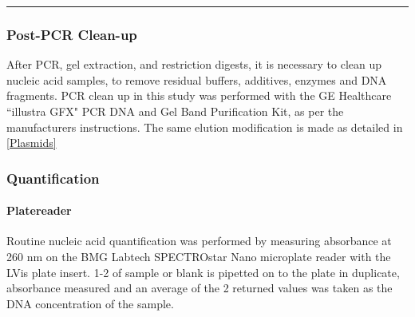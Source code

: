 \hrule
		
	\subsubsection{Post-PCR Clean-up}\label{pcrcleanup}
	After PCR, gel extraction, and restriction digests, it is necessary to clean up nucleic acid samples, to remove residual buffers, additives, enzymes and DNA fragments. PCR clean up in this study was performed with the GE Healthcare ``illustra GFX" PCR DNA and Gel Band Purification Kit, as per the manufacturers instructions. The same elution modification is made as detailed in \vref{Plasmids}
	
	\subsubsection{Quantification}
	\paragraph{Platereader}
	Routine nucleic acid quantification was performed by measuring absorbance at 260 nm on the BMG Labtech SPECTROstar Nano microplate reader with the LVis plate insert. 1-2\ul{} of sample or blank is pipetted on to the plate in duplicate, absorbance measured and an average of the 2 returned values was taken as the DNA concentration of the sample.
	
%	
